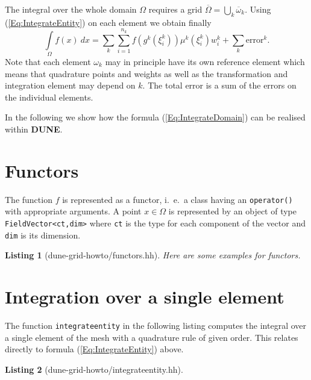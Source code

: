 \documentclass[11pt,a4paper,headinclude,footinclude,DIV16,headings=normal]{scrreprt}
\newcommand{\Dune}{{\sffamily\bfseries DUNE}\xspace}
\newtheorem{lst}{Listing}
\begin{document}
The integral over the whole domain $\Omega$ requires a grid
$\overline{\Omega}=\bigcup_k \overline{\omega}_k$. Using
(\ref{Eq:IntegrateEntity}) on each element we obtain finally
\begin{equation}
\int\limits_{\Omega} f(x)\ dx = \sum\limits_{k} \sum_{i=1}^{n_k}
f(g^k(\xi^k_i))\mu^k(\xi^k_i)w^k_i + \sum\limits_{k} \text{error}^k.
\label{Eq:IntegrateDomain}
\end{equation}
Note that each element $\omega_k$ may in principle have its own
reference element which means that quadrature points and weights as
well as the transformation and integration element may depend on
$k$. The total error is a sum of the errors on the individual
elements.

In the following we show how the formula (\ref{Eq:IntegrateDomain})
can be realised within \Dune.


\section{Functors}

The function $f$ is represented as a functor, i.~e.~a class having an
\lstinline!operator()! with appropriate arguments. A point
$x\in\Omega$ is represented by an object of type
\lstinline!FieldVector<ct,dim>! where \lstinline!ct! is the type for
each component of the vector and \lstinline!dim! is its dimension.


\begin{lst}[dune-grid-howto/functors.hh] Here are some examples for functors.


\end{lst}


\section{Integration over a single element}

The function \lstinline!integrateentity! in the following listing
computes the integral over a single element of the mesh with a
quadrature rule of given order.
This relates directly to formula (\ref{Eq:IntegrateEntity}) above.

\begin{lst}[dune-grid-howto/integrateentity.hh] \mbox{}


\end{lst}
\end{document}
